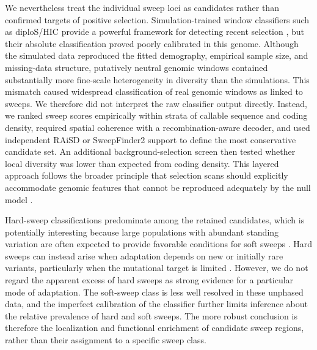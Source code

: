 \documentclass[11pt]{article}
\begin{document}
We nevertheless treat the individual sweep loci as candidates rather than confirmed targets of positive selection. Simulation-trained window classifiers such as diploS/HIC provide a powerful framework for detecting recent selection \citep{schrider2016,kern2018diploshic}, but their absolute classification proved poorly calibrated in this genome. Although the simulated data reproduced the fitted demography, empirical sample size, and missing-data structure, putatively neutral genomic windows contained substantially more fine-scale heterogeneity in diversity than the simulations. This mismatch caused widespread classification of real genomic windows as linked to sweeps. We therefore did not interpret the raw classifier output directly. Instead, we ranked sweep scores empirically within strata of callable sequence and coding density, required spatial coherence with a recombination-aware decoder, and used independent RAiSD or SweepFinder2 support to define the most conservative candidate set. An additional background-selection screen then tested whether local diversity was lower than expected from coding density. This layered approach follows the broader principle that selection scans should explicitly accommodate genomic features that cannot be reproduced adequately by the null model \citep{johri2022}.

Hard-sweep classifications predominate among the retained candidates, which is potentially interesting because large populations with abundant standing variation are often expected to provide favorable conditions for soft sweeps \citep{messer2013soft}. Hard sweeps can instead arise when adaptation depends on new or initially rare variants, particularly when the mutational target is limited \citep{hermisson2005,harris2018}. However, we do not regard the apparent excess of hard sweeps as strong evidence for a particular mode of adaptation. The soft-sweep class is less well resolved in these unphased data, and the imperfect calibration of the classifier further limits inference about the relative prevalence of hard and soft sweeps. The more robust conclusion is therefore the localization and functional enrichment of candidate sweep regions, rather than their assignment to a specific sweep class.
\end{document}
